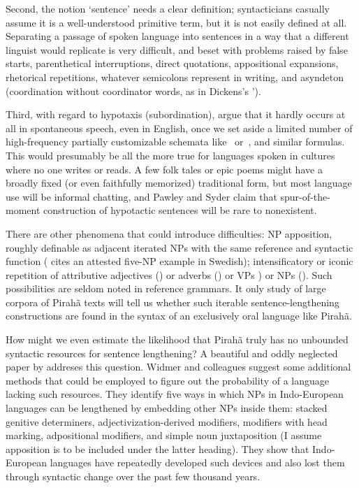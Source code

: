\documentclass[output=paper,colorlinks,citecolor=brown
]{langscibook}
\begin{document}
Second, the notion `sentence' needs a clear definition; syntacticians
casually assume it is a well-understood primitive term, but it is not
easily defined at all. Separating a passage of spoken language into
sentences in a way that a different linguist would replicate is very
difficult, and beset with problems raised by false starts,
parenthetical interruptions, direct quotations, appositional
expansions, rhetorical repetitions, whatever semicolons represent in
writing, and asyndeton (coordination without coordinator words, as
in Dickens's ').

Third, with regard to hypotaxis (subordination), \citet{PawlSyde00}
argue that it hardly occurs at all in spontaneous speech, even in
English, once we set aside a limited number of high-frequency partially
customizable schemata like \, or \,, and similar formulas. This would presumably be all
the more true for languages spoken in cultures where no one writes
or reads. A few folk tales or epic poems might have a broadly fixed
(or even faithfully memorized) traditional form, but most language
use will be informal chatting, and Pawley and Syder claim that
spur-of-the-moment construction of hypotactic sentences will be rare
to nonexistent.

There are other phenomena that could introduce difficulties: NP
apposition, roughly definable as adjacent iterated NPs with the same
reference and syntactic function (\citealt{Karlsson10} cites an
attested five-NP example in Swedish); intensificatory or iconic
repetition of attributive adjectives ()
or adverbs () or VPs ) or NPs (). Such possibilities are seldom noted
in reference grammars. It only study of large corpora of Pirah{\~a}
texts will tell us whether such iterable sentence-lengthening
constructions are found in the syntax of an exclusively oral language
like Pirah{\~a}.

How might we even estimate the likelihood that Pirah{\~a} truly has no
unbounded syntactic resources for sentence lengthening? A beautiful
and oddly neglected paper by \citet{WidmerEtAl17} addreses this
question. Widmer and colleagues suggest some additional methods that
could be employed to figure out the probability of a language lacking
such resources. They identify five ways in which NPs in Indo-European
languages can be lengthened by embedding other NPs inside them: stacked
genitive determiners, adjectivization-derived modifiers, modifiers
with head marking, adpositional modifiers, and simple noun
juxtaposition (I assume apposition is to be included under the latter
heading). They show that Indo-European languages have repeatedly
developed such devices and also lost them through syntactic change
over the past few thousand years.
\end{document}
